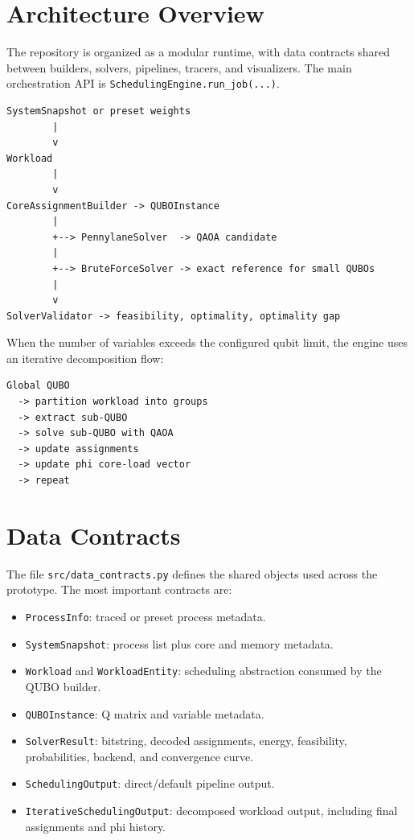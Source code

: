 \documentclass[12pt,a4paper,oneside]{report}
\begin{document}
\section{Architecture Overview}

The repository is organized as a modular runtime, with data contracts shared
between builders, solvers, pipelines, tracers, and visualizers. The main
orchestration API is \texttt{SchedulingEngine.run\_job(...)}.

\begin{lstlisting}[caption={High-level scheduling flow.}]
SystemSnapshot or preset weights
        |
        v
Workload
        |
        v
CoreAssignmentBuilder -> QUBOInstance
        |
        +--> PennylaneSolver  -> QAOA candidate
        |
        +--> BruteForceSolver -> exact reference for small QUBOs
        |
        v
SolverValidator -> feasibility, optimality, optimality gap
\end{lstlisting}

When the number of variables exceeds the configured qubit limit, the engine
uses an iterative decomposition flow:

\begin{lstlisting}[caption={Iterative sub-QUBO flow.}]
Global QUBO
  -> partition workload into groups
  -> extract sub-QUBO
  -> solve sub-QUBO with QAOA
  -> update assignments
  -> update phi core-load vector
  -> repeat
\end{lstlisting}

\section{Data Contracts}

The file \texttt{src/data\_contracts.py} defines the shared objects used across
the prototype. The most important contracts are:

\begin{itemize}
  \item \texttt{ProcessInfo}: traced or preset process metadata.
  \item \texttt{SystemSnapshot}: process list plus core and memory metadata.
  \item \texttt{Workload} and \texttt{WorkloadEntity}: scheduling abstraction
  consumed by the QUBO builder.
  \item \texttt{QUBOInstance}: Q matrix and variable metadata.
  \item \texttt{SolverResult}: bitstring, decoded assignments, energy,
  feasibility, probabilities, backend, and convergence curve.
  \item \texttt{SchedulingOutput}: direct/default pipeline output.
  \item \texttt{IterativeSchedulingOutput}: decomposed workload output,
  including final assignments and phi history.
\end{itemize}
\end{document}
